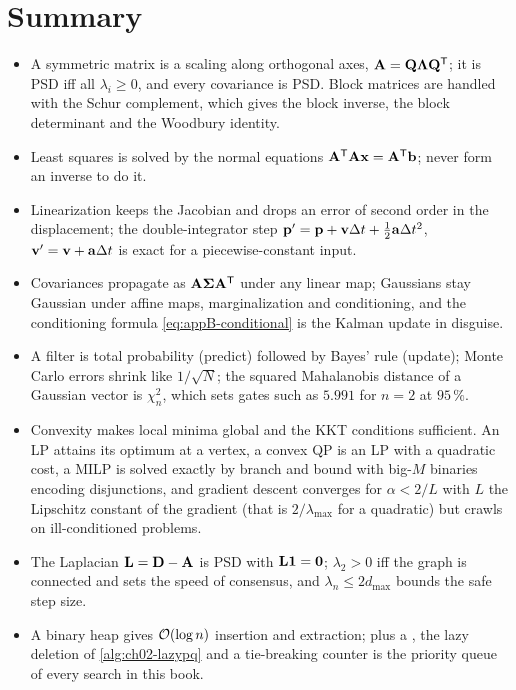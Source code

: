 \section{Summary}
\begin{summary}
\begin{itemize}
  \item A symmetric matrix is a scaling along orthogonal axes, $\mathbf{A} = \mathbf{Q}\mathbf{\Lambda}\mathbf{Q}^{\mathsf{T}}$; it is PSD iff all $\lambda_i \ge 0$, and every covariance is PSD. Block matrices are handled with the Schur complement, which gives the block inverse, the block determinant and the Woodbury identity.
  \item Least squares is solved by the normal equations $\mathbf{A}^{\mathsf{T}}\mathbf{A}\mathbf{x} = \mathbf{A}^{\mathsf{T}}\mathbf{b}$; never form an inverse to do it.
  \item Linearization keeps the Jacobian and drops an error of second order in the displacement; the double-integrator step $\mathbf{p}' = \mathbf{p} + \mathbf{v}\Delta t + \tfrac12\mathbf{a}\Delta t^2$, $\mathbf{v}' = \mathbf{v} + \mathbf{a}\Delta t$ is exact for a piecewise-constant input.
  \item Covariances propagate as $\mathbf{A}\mathbf{\Sigma}\mathbf{A}^{\mathsf{T}}$ under any linear map; Gaussians stay Gaussian under affine maps, marginalization and conditioning, and the conditioning formula \cref{eq:appB-conditional} is the Kalman update in disguise.
  \item A filter is total probability (predict) followed by Bayes' rule (update); Monte Carlo errors shrink like $1/\sqrt{N}$; the squared Mahalanobis distance of a Gaussian vector is $\chi^2_n$, which sets gates such as $5.991$ for $n = 2$ at $95\,\%$.
  \item Convexity makes local minima global and the KKT conditions sufficient. An LP attains its optimum at a vertex, a convex QP is an LP with a quadratic cost, a MILP is solved exactly by branch and bound with big-$M$ binaries encoding disjunctions, and gradient descent converges for $\alpha < 2/L$ with $L$ the Lipschitz constant of the gradient (that is $2/\lambda_{\max}$ for a quadratic) but crawls on ill-conditioned problems.
  \item The Laplacian $\mathbf{L} = \mathbf{D} - \mathbf{A}$ is PSD with $\mathbf{L}\mathbf{1} = \mathbf{0}$; $\lambda_2 > 0$ iff the graph is connected and sets the speed of consensus, and $\lambda_n \le 2d_{\max}$ bounds the safe step size.
  \item A binary heap gives $\mathcal{O}\!\left(\log n\right)$ insertion and extraction;  plus a , the lazy deletion of \cref{alg:ch02-lazypq} and a tie-breaking counter is the priority queue of every search in this book.
\end{itemize}
\end{summary}

